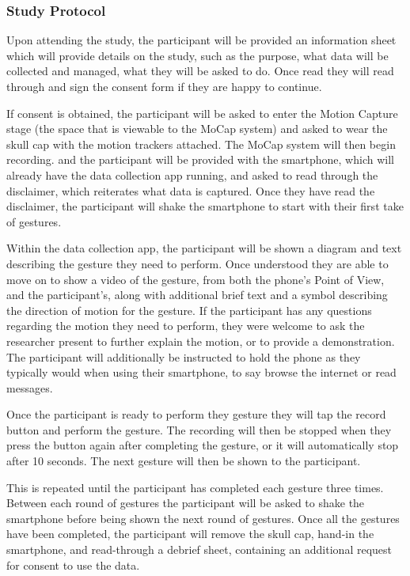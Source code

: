\subsubsection{Study Protocol}\nl
Upon attending the study, the participant will be provided an information sheet which will provide details on the study, such as the purpose, what data will be collected and managed, what they will be asked to do. Once read they will read through and sign the consent form if they are happy to continue.

If consent is obtained, the participant will be asked to enter the Motion Capture stage (the space that is viewable to the MoCap system) and asked to wear the skull cap with the motion trackers attached.
The MoCap system will then begin recording. and the participant will be provided with the smartphone, which will already have the data collection app running, and asked to read through the disclaimer, which reiterates what data is captured. Once they have read the disclaimer, the participant will shake the smartphone to start with their first take of gestures.

Within the data collection app, the participant will be shown a diagram and text describing the gesture they need to perform. Once understood they are able to move on to show a video of the gesture, from both the phone's Point of View, and the participant's, along with additional brief text and a symbol describing the direction of motion for the gesture.
If the participant has any questions regarding the motion they need to perform, they were welcome to ask the researcher present to further explain the motion, or to provide a demonstration.
The participant will additionally be instructed to hold the phone as they typically would when using their smartphone, to say browse the internet or read messages.

Once the participant is ready to perform they gesture they will tap the record button and perform the gesture. The recording will then be stopped when they press the button again after completing the gesture, or it will automatically stop after 10 seconds.
The next gesture will then be shown to the participant.

This is repeated until the participant has completed each gesture three times. Between each round of gestures the participant will be asked to shake the smartphone before being shown the next round of gestures. Once all the gestures have been completed, the participant will remove the skull cap, hand-in the smartphone, and read-through a debrief sheet, containing an additional request for consent to use the data.

